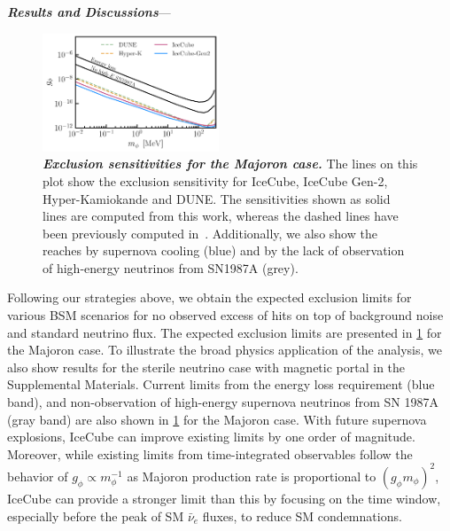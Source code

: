 \documentclass[aps,twocolumn,prl,showpacs,showkeys,preprintnumbers,superscriptaddress,nobibnotes,floatfix,longbibliography,notitlepage,nofootinbib]{revtex4-2}
\begin{document}

\textbf{\textit{Results and Discussions}}---
\begin{figure}[t!]
    \centering
    \includegraphics[width=0.47\textwidth]{figures/majoran_sensitivity}
    \caption{\textbf{\textit{Exclusion sensitivities for the Majoron case.}}
    The lines on this plot show the exclusion sensitivity for IceCube, IceCube Gen-2, Hyper-Kamiokande and DUNE.
    The sensitivities shown as solid lines are computed from this work, whereas the dashed lines have been previously computed in~\cite{Brdar:2023tmi}.
    Additionally, we also show the reaches by supernova cooling (blue) and by the lack of observation of high-energy neutrinos from SN1987A (grey). %
    }
    \label{fig:sensitivity}
\end{figure} 
Following our strategies above, we obtain the expected exclusion limits for various BSM scenarios for no observed excess of hits on top of background noise and standard neutrino flux.
The expected exclusion limits are presented in \cref{fig:sensitivity} for the Majoron case. To illustrate the broad physics application of the analysis, we also show results for the sterile neutrino case with magnetic portal in the Supplemental Materials.
Current limits \cite{Fiorillo:2022cdq} from the energy loss requirement (blue band), and non-observation of high-energy supernova neutrinos from SN 1987A (gray band) are also shown in \cref{fig:sensitivity} for the Majoron case. With future supernova explosions, IceCube can improve existing limits by one order of magnitude. 
Moreover, while existing limits from time-integrated observables follow the behavior of $g_\phi\propto m^{-1}_\phi$ as Majoron production rate is proportional to $(g_\phi m_\phi)^2$, IceCube can provide a stronger limit than this by focusing on the time window, especially before the peak of SM $\bar{\nu}_e$ fluxes, to reduce SM condemnations.
\end{document}
